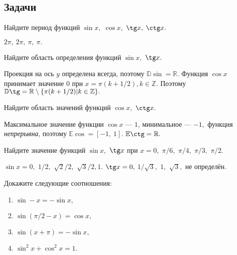\subsection*{Задачи}
\begin{task}
Найдите период функций $\sin x,$ $\cos x,$ $\tg x,$ $\ctg x.$
\end{task}
\begin{solution}
$2\pi,~2\pi,~\pi,~\pi.$
\end{solution}
\begin{task}
Найдите область определения функций $\sin x,$ $\tg x.$
\end{task}
\begin{solution}
Проекция на ось $y$ определена всегда, поэтому
$\mathbb{D}\sin = \mathbb{R}.$
Функция $\cos x$ принимает значение $0$ при $x=\pi (k + 1/2), k \in \mathbb{Z}.$
Поэтому $\mathbb{D}\tg = \mathbb{R}\setminus\{\pi (k +1/2)\vert k\in\mathbb{Z}\}.$
\end{solution}
\begin{task}
Найдите область значений функций $\cos x,$ $\ctg x.$
\end{task}
\begin{solution}
Максимальное значение функции $\cos x$ --- $1$,
минимальное --- $-1,$ функция
\textit{непрерывна},
поэтому $\mathbb{E}\cos = [-1,~1].$
$\mathbb{E}\ctg = \mathbb{R}.$
\end{solution}
\begin{task}
Найдите значение функций $\sin x,$ $\tg x$
при $x =  0,$ 
$\pi/6,$ $\pi/4,$ $\pi/3,$ $\pi/2.$
\end{task}
\begin{solution}
$\sin x = 0,$ $1/2,$ $\sqrt 2/2,$ $\sqrt 3/2, 1.$
$\tg x = 0,$ $1/\sqrt 3,$ $1,$ $\sqrt 3,$ не определён.
\end{solution}
\begin{task}
Докажите следующие соотношения:
\begin{enumerate}
\item $\sin -x = -\sin x,$
\item $\sin (\pi/2-x) = \cos x,$
\item $\sin (x+\pi) = -\sin x,$
\item $\sin^2 x + \cos^2 x = 1.$
\end{enumerate}
\end{task}
